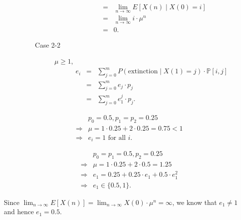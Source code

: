 \begin{question}
\begin{description}
\begin{itemize}
\begin{description}
\begin{eqnarray*}
                & = & \lim_{n \to \infty} E[X(n) \mid X(0) = i] \\
                & = & \lim_{n \to \infty} i \cdot \mu^{n} \\
                & = & 0.
            \end{eqnarray*}
          \item[Case 2-2] $ \mu \ge 1 $,
            \begin{eqnarray*}
              e_{i}
                & = & \sum_{j = 0}^{m} P(\text{extinction} \mid X(1) = j) \cdot \mathbb{P}[i, j] \\
                & = & \sum_{j = 0}^{m} e_{j} \cdot p_{j} \\
                & = & \sum_{j = 0}^{m} e_{1}^{j} \cdot p_{j}.
            \end{eqnarray*}
        \end{description}
    \end{itemize}
\end{description}
\end{question}

\begin{example}
\begin{eqnarray*}
  & & p_{0} = 0.5, p_{1} = p_{2} = 0.25 \\
  & \Rightarrow & \mu = 1 \cdot 0.25 + 2 \cdot 0.25 = 0.75 < 1 \\
  & \Rightarrow & e_{i} = 1 \text{ for all } i.
\end{eqnarray*}
\end{example}

\begin{example}
\begin{eqnarray*}
  & & p_{0} = p_{1} = 0.5, p_{2} = 0.25 \\
  & \Rightarrow & \mu = 1 \cdot 0.25 + 2 \cdot 0.5 = 1.25 \\
  & \Rightarrow & e_{1} = 0.25 + 0.25 \cdot e_{1} + 0.5 \cdot e_{1}^{2} \\
  & \Rightarrow & e_{1} \in \{ 0.5, 1 \}.
\end{eqnarray*}

Since $ \lim_{n \to \infty} E[X(n)] = \lim_{n \to \infty} X(0) \cdot \mu^{n} = \infty $, we know that $ e_{1} \neq 1 $ and hence $ e_{1} = 0.5 $.
\end{example}
